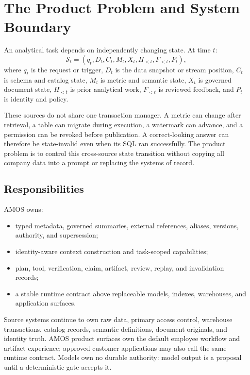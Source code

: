 \documentclass[10pt]{article}
\newcommand{\amos}{\textsc{AMOS}\xspace}
\newcommand{\state}{\mathcal{S}}
\begin{document}
\section{The Product Problem and System Boundary}

An analytical task depends on independently changing state. At time $t$:
\begin{equation}
  \state_t = (q_t, D_t, C_t, M_t, X_t, H_{<t}, F_{<t}, P_t),
\end{equation}
where $q_t$ is the request or trigger, $D_t$ is the data snapshot or stream position, $C_t$ is schema and catalog state, $M_t$ is metric and semantic state, $X_t$ is governed document state, $H_{<t}$ is prior analytical work, $F_{<t}$ is reviewed feedback, and $P_t$ is identity and policy.

These sources do not share one transaction manager. A metric can change after retrieval, a table can migrate during execution, a watermark can advance, and a permission can be revoked before publication. A correct-looking answer can therefore be state-invalid even when its SQL ran successfully. The product problem is to control this cross-source state transition without copying all company data into a prompt or replacing the systems of record.

\subsection{Responsibilities}

\amos owns:
\begin{itemize}
  \item typed metadata, governed summaries, external references, aliases, versions, authority, and supersession;
  \item identity-aware context construction and task-scoped capabilities;
  \item plan, tool, verification, claim, artifact, review, replay, and invalidation records;
  \item a stable runtime contract above replaceable models, indexes, warehouses, and application surfaces.
\end{itemize}

Source systems continue to own raw data, primary access control, warehouse transactions, catalog records, semantic definitions, document originals, and identity truth. \amos product surfaces own the default employee workflow and artifact experience; approved customer applications may also call the same runtime contract. Models own no durable authority: model output is a proposal until a deterministic gate accepts it.
\end{document}
